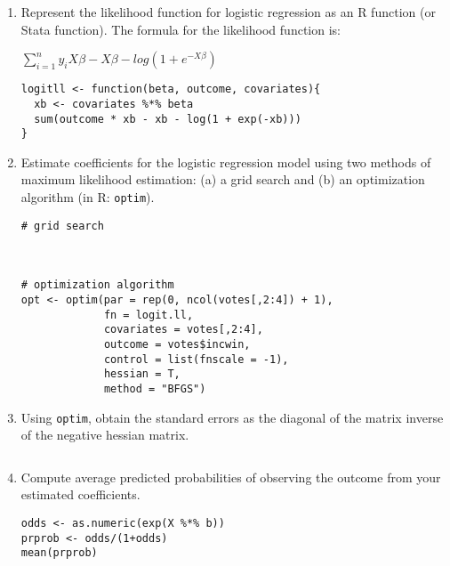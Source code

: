 \documentclass[a4paper,11pt]{article}
\begin{document}
\begin{enumerate}
\item Represent the likelihood function for logistic regression as an R function (or Stata function). The formula for the likelihood function is:

$\sum_{i=1}^{n} y_i X\beta - X\beta - log(1 + e^{-X \beta})$

\begin{solution}
\begin{lstlisting}
logitll <- function(beta, outcome, covariates){
  xb <- covariates %*% beta
  sum(outcome * xb - xb - log(1 + exp(-xb)))
}
\end{lstlisting}
\end{solution}


\item Estimate coefficients for the logistic regression model using two methods of maximum likelihood estimation: (a) a grid search and (b) an optimization algorithm (in R: \texttt{optim}).

\begin{solution}
\begin{lstlisting}
# grid search



# optimization algorithm
opt <- optim(par = rep(0, ncol(votes[,2:4]) + 1),
             fn = logit.ll,
             covariates = votes[,2:4],
             outcome = votes$incwin,
             control = list(fnscale = -1),
             hessian = T,
             method = "BFGS")
\end{lstlisting}
\end{solution}

\item Using \texttt{optim}, obtain the standard errors as the diagonal of the matrix inverse of the negative hessian matrix.

\begin{solution}
\begin{lstlisting}

\end{lstlisting}
\end{solution}

\item Compute average predicted probabilities of observing the outcome from your estimated coefficients.

\begin{solution}
\begin{lstlisting}
odds <- as.numeric(exp(X %*% b))
prprob <- odds/(1+odds)
mean(prprob)
\end{lstlisting}
\end{solution}


\end{enumerate}
\end{document}
